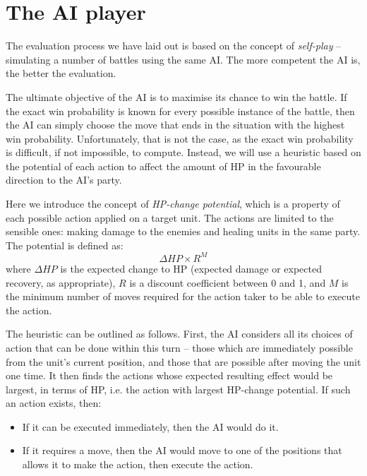 \section{The AI player}
\label{sub:aidesign}

The evaluation process we have laid out is based on the concept of \textit{self-play} -- simulating a number of battles using the same AI. The more competent the AI is, the better the evaluation.

The ultimate objective of the AI is to maximise its chance to win the battle. If the exact win probability is known for every possible instance of the battle, then the AI can simply choose the move that ends in the situation with the highest win probability. Unfortunately, that is not the case, as the exact win probability is difficult, if not impossible, to compute. Instead, we will use a heuristic based on the potential of each action to affect the amount of HP in the favourable direction to the AI's party.

Here we introduce the concept of \textit{HP-change potential}, which is a property of each possible action applied on a target unit. The actions are limited to the sensible ones: making damage to the enemies and healing units in the same party. The potential is defined as:
\[
	\Delta HP \times R^M
\]
where $\Delta HP$ is the expected change to HP (expected damage or expected recovery, as appropriate), $R$ is a discount coefficient between 0 and 1, and $M$ is the minimum number of moves required for the action taker to be able to execute the action.

The heuristic can be outlined as follows. First, the AI considers all its choices of action that can be done within this turn -- those which are immediately possible from the unit's current position, and those that are possible after moving the unit one time. It then finds the actions whose expected resulting effect would be largest, in terms of HP, i.e. the action with largest HP-change potential. If such an action exists, then:
\begin{itemize}
	\item If it can be executed immediately, then the AI would do it.
	\item If it requires a move, then the AI would move to one of the positions that allows it to make the action, then execute the action.
\end{itemize}

